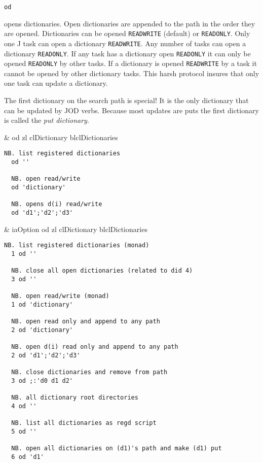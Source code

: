  \hypertarget{il:od}{\texttt{od}} opens
 dictionaries. Open dictionaries are appended to the
 path in the order they are opened. Dictionaries can be opened \texttt{READWRITE}
 (default) or \texttt{READONLY}. Only one J task can open 
 a dictionary \texttt{READWRITE}.  
 Any number of tasks can open a dictionary \texttt{READONLY}. 
 If any task has a dictionary open \texttt{READONLY} it can only 
 be opened \texttt{READONLY} by other tasks. If a 
 dictionary is opened \texttt{READWRITE} by a task it 
 cannot be opened by other dictionary tasks. This harsh protocol
  insures that only one task can update a dictionary. 

The first dictionary on the search path is special!  
It is the only dictionary that can be updated by JOD verbs. 
Because most updates are puts the first dictionary is called the \emph{put dictionary}.

\begin{wordhead}
\monad & od zl \argsep clDictionary \argsep blclDictionaries \\
\end{wordhead}
\begin{lstlisting}[frame=single,framerule=0pt] 
  NB. list registered dictionaries 
  od '' 

  NB. open read/write
  od 'dictionary'   
  
  NB. opens d(i) read/write 
  od 'd1';'d2';'d3'  
\end{lstlisting}

\begin{wordhead}
\dyad & iaOption od zl \argsep clDictionary \argsep blclDictionaries \\
\end{wordhead}
\begin{lstlisting}[frame=single,framerule=0pt] 
  NB. list registered dictionaries (monad)
  1 od '' 
  
  NB. close all open dictionaries (related to did 4) 
  3 od '' 

  NB. open read/write (monad)
  1 od 'dictionary' 
  
  NB. open read only and append to any path 
  2 od 'dictionary'   

  NB. open d(i) read only and append to any path
  2 od 'd1';'d2';'d3' 
  
  NB. close dictionaries and remove from path
  3 od ;:'d0 d1 d2'  
  
  NB. all dictionary root directories
  4 od ''  
              
  NB. list all dictionaries as regd script
  5 od ''  

  NB. open all dictionaries on (d1)'s path and make (d1) put
  6 od 'd1'            
\end{lstlisting}


